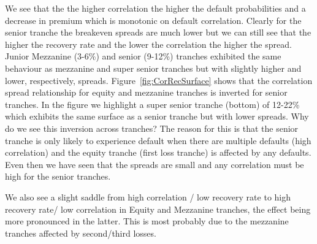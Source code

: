  We see that the the higher correlation the higher the default probabilities and a decrease in premium which is monotonic on default correlation.  Clearly for the senior tranche the breakeven spreads are much lower but we can still see that the higher the recovery rate and the lower the correlation the higher the spread. Junior Mezzanine (3-6\%) and senior (9-12\%) tranches exhibited the same behaviour as mezzanine and super senior tranches but with slightly higher and lower, respectively, spreads. Figure~\ref{fig:CorRecSurface} shows that the correlation spread relationship for equity and mezzanine tranches is inverted for senior tranches. In the figure we highlight a super senior tranche (bottom) of 12-22\% which exhibits the same surface as a senior tranche but with lower spreads.  Why do we see this inversion across tranches? The reason for this is that the senior tranche is only likely to experience default when there are multiple defaults (high correlation) and the equity tranche (first loss tranche) is affected by any defaults. Even then we have seen that the spreads are small and any correlation must be high for the senior tranches.

We also see a slight saddle from high correlation / low recovery rate to high recovery rate/ low correlation in Equity and Mezzanine tranches, the effect being more pronounced in the latter. This is most probably due to the mezzanine tranches affected by second/third losses.

